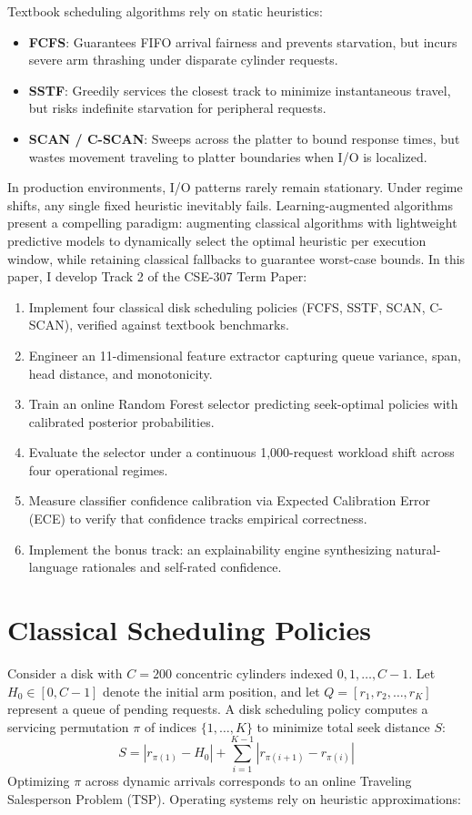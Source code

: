 \documentclass[conference,10pt]{IEEEtran}
\begin{document}
Textbook scheduling algorithms rely on static heuristics:
\begin{itemize}
    \item \textbf{FCFS}: Guarantees FIFO arrival fairness and prevents starvation, but incurs severe arm thrashing under disparate cylinder requests.
    \item \textbf{SSTF}: Greedily services the closest track to minimize instantaneous travel, but risks indefinite starvation for peripheral requests.
    \item \textbf{SCAN / C-SCAN}: Sweeps across the platter to bound response times, but wastes movement traveling to platter boundaries when I/O is localized.
\end{itemize}

In production environments, I/O patterns rarely remain stationary. Under regime shifts, any single fixed heuristic inevitably fails. Learning-augmented algorithms \cite{mitzenmacher2021, kraska2018case} present a compelling paradigm: augmenting classical algorithms with lightweight predictive models to dynamically select the optimal heuristic per execution window, while retaining classical fallbacks to guarantee worst-case bounds. In this paper, I develop Track 2 of the CSE-307 Term Paper:
\begin{enumerate}
    \item Implement four classical disk scheduling policies (FCFS, SSTF, SCAN, C-SCAN), verified against textbook benchmarks.
    \item Engineer an 11-dimensional feature extractor capturing queue variance, span, head distance, and monotonicity.
    \item Train an online Random Forest selector predicting seek-optimal policies with calibrated posterior probabilities.
    \item Evaluate the selector under a continuous 1,000-request workload shift across four operational regimes.
    \item Measure classifier confidence calibration via Expected Calibration Error (ECE) to verify that confidence tracks empirical correctness.
    \item Implement the bonus track: an explainability engine synthesizing natural-language rationales and self-rated confidence.
\end{enumerate}

\section{Classical Scheduling Policies}
Consider a disk with $C = 200$ concentric cylinders indexed $0, 1, \dots, C-1$. Let $H_0 \in [0, C-1]$ denote the initial arm position, and let $Q = [r_1, r_2, \dots, r_K]$ represent a queue of pending requests. A disk scheduling policy computes a servicing permutation $\pi$ of indices $\{1, \dots, K\}$ to minimize total seek distance $S$:
\begin{equation}
    S = |r_{\pi(1)} - H_0| + \sum_{i=1}^{K-1} |r_{\pi(i+1)} - r_{\pi(i)}|
    \label{eq:total_seek}
\end{equation}
Optimizing $\pi$ across dynamic arrivals corresponds to an online Traveling Salesperson Problem (TSP). Operating systems rely on heuristic approximations:
\end{document}
